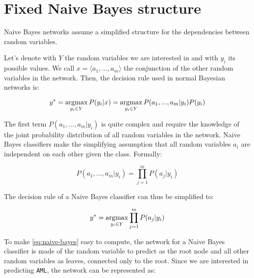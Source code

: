 \section{Fixed Naive Bayes structure}
\label{sec:naive}

Naive Bayes networks assume a simplified structure for the dependencies between random variables.

Let's denote with $Y$ the random variables we are interested in and with $y_i$ its possible values.
We call $x = \langle a_1, ..., a_m \rangle$ the conjunction of the other random variables in the network.
Then, the decision rule used in normal Bayesian networks is:

\begin{equation*}
    y^{*} = \operatorname*{arg\!\max}_{y_i \in Y} P(y_i | x)
          = \operatorname*{arg\!\max}_{y_i \in Y} P(a_1, ..., a_m | y_i) P(y_i)
\end{equation*}

The first term $P(a_1, ..., a_m | y_i)$ is quite complex and require the knowledge of the joint probability distribution of all random variables in the network.
Naive Bayes classifiers make the simplifying assumption that all random variables $a_i$ are independent on each other given the class. Formally:

\begin{equation*}
     P(a_1, ..., a_m | y_i) = \prod_{j=1}^{m} P(a_j | y_i)
\end{equation*}

The decision rule of a Naive Bayes classifier can thus be simplified to:

\begin{equation}
    y^{*} = \operatorname*{arg\!\max}_{y_i \in Y} \prod_{j=1}^{m} P(a_j | y_i)
    \label{eq:naive-bayes}
\end{equation}

To make \cref{eq:naive-bayes} easy to compute, the network for a Naive Bayes classifier is made of the random variable to predict as the root node and all other random variables as leaves, connected only to the root.
Since we are interested in predicting \texttt{AML}, the network can be represented as:

\vspace{2mm}

\begin{center}
\end{center}


